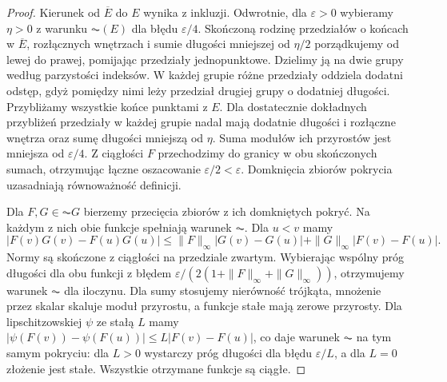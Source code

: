 \begin{proof}
Kierunek od $\overline E$ do $E$ wynika z inkluzji.
Odwrotnie, dla $\varepsilon>0$ wybieramy $\eta>0$ z warunku
$\AC(E)$ dla błędu $\varepsilon/4$. Skończoną rodzinę
przedziałów o końcach w $\overline E$, rozłącznych wnętrzach
i sumie długości mniejszej od $\eta/2$ porządkujemy od lewej
do prawej, pomijając przedziały jednopunktowe.
Dzielimy ją na dwie grupy według parzystości indeksów.
W każdej grupie różne przedziały oddziela dodatni odstęp,
gdyż pomiędzy nimi leży przedział drugiej grupy o dodatniej
długości. Przybliżamy wszystkie końce punktami z $E$.
Dla dostatecznie dokładnych przybliżeń przedziały w każdej
grupie nadal mają dodatnie długości i rozłączne wnętrza oraz sumę długości
mniejszą od $\eta$. Suma modułów ich przyrostów jest
mniejsza od $\varepsilon/4$. Z ciągłości $F$ przechodzimy
do granicy w obu skończonych sumach, otrzymując łączne
oszacowanie $\varepsilon/2<\varepsilon$. Domknięcia zbiorów
pokrycia uzasadniają równoważność definicji.

Dla $F,G\in\AC G$ bierzemy przecięcia zbiorów z ich
domkniętych pokryć. Na każdym z nich obie funkcje spełniają
warunek $\AC$. Dla $u<v$ mamy
\[
 |F(v)G(v)-F(u)G(u)|
 \le \|F\|_\infty|G(v)-G(u)|+
 \|G\|_\infty|F(v)-F(u)|.
\]
Normy są skończone z ciągłości na przedziale zwartym.
Wybierając wspólny próg długości dla obu funkcji z błędem
$\varepsilon/(2(1+\|F\|_\infty+\|G\|_\infty))$,
otrzymujemy warunek $\AC$ dla iloczynu.
Dla sumy stosujemy nierówność trójkąta, mnożenie przez
skalar skaluje moduł przyrostu, a funkcje stałe mają zerowe
przyrosty. Dla lipschitzowskiej $\psi$ ze stałą $L$ mamy
$|\psi(F(v))-\psi(F(u))|\le L|F(v)-F(u)|$,
co daje warunek $\AC$ na tym samym pokryciu: dla $L>0$
wystarczy próg długości dla błędu $\varepsilon/L$, a dla $L=0$
złożenie jest stałe.
Wszystkie otrzymane funkcje są ciągłe.
\end{proof}



